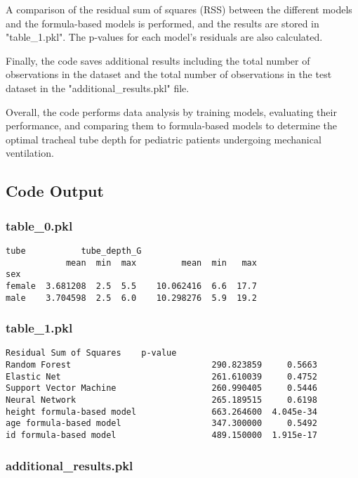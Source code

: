 \documentclass[11pt]{article}
\begin{document}
A comparison of the residual sum of squares (RSS) between the different models and the formula-based models is performed, and the results are stored in "table\_1.pkl". The p-values for each model's residuals are also calculated.

Finally, the code saves additional results including the total number of observations in the dataset and the total number of observations in the test dataset in the "additional\_results.pkl" file.

Overall, the code performs data analysis by training models, evaluating their performance, and comparing them to formula-based models to determine the optimal tracheal tube depth for pediatric patients undergoing mechanical ventilation.

\subsection{Code Output}

\subsubsection*{table\_0.pkl}

\begin{Verbatim}[tabsize=4]
            tube           tube_depth_G
            mean  min  max         mean  min   max
sex
female  3.681208  2.5  5.5    10.062416  6.6  17.7
male    3.704598  2.5  6.0    10.298276  5.9  19.2
\end{Verbatim}

\subsubsection*{table\_1.pkl}

\begin{Verbatim}[tabsize=4]
                            Residual Sum of Squares    p-value
Random Forest                            290.823859     0.5663
Elastic Net                              261.610039     0.4752
Support Vector Machine                   260.990405     0.5446
Neural Network                           265.189515     0.6198
height formula-based model               663.264600  4.045e-34
age formula-based model                  347.300000     0.5492
id formula-based model                   489.150000  1.915e-17
\end{Verbatim}

\subsubsection*{additional\_results.pkl}
\end{document}
